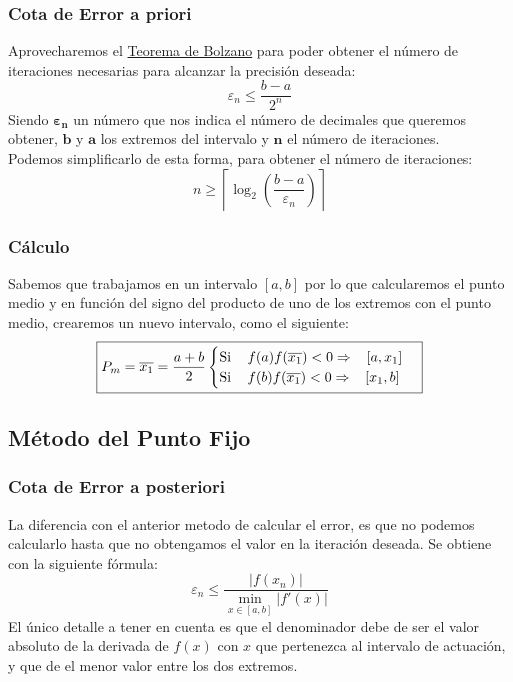 \subsubsection{Cota de Error a priori}
Aprovecharemos el \underline{Teorema de Bolzano} para poder obtener el número de iteraciones necesarias para alcanzar la precisión deseada:
\[
        \boxed{\varepsilon_n \leq \frac{b-a}{2^n}}
\]
Siendo \(\mathbf{\varepsilon_n}\) un número que nos indica el número de decimales que queremos obtener, \(\mathbf{b}\) y \(\mathbf{a}\) los extremos del intervalo y \(\mathbf{n}\) el número de iteraciones.\\ Podemos simplificarlo de esta forma, para obtener el número de iteraciones:
\[
        \boxed{n\geq \left \lceil \log_2{\left ( \frac{b-a}{\varepsilon_n} \right )} \right \rceil}
\]
\subsubsection{Cálculo}
Sabemos que trabajamos en un intervalo \([a,b]\) por lo que calcularemos el punto medio y en función del signo del producto de uno de los extremos con el punto medio, crearemos un nuevo intervalo, como el siguiente:
\[
        \boxed{P_m = \overline{x_1} = \frac{a+b}{2}
                \begin{cases}
                        \text{Si \hspace{3mm}} f(a)f(\overline{x_1}) < 0  \Rightarrow \text{\hspace{3mm}} [a, x_1] \\
                        \text{Si \hspace{3mm}} f(b)f(\overline{x_1}) < 0 \Rightarrow\text{\hspace{3mm}} [x_1, b]
                \end{cases}}
\]
\subsection{Método del Punto Fijo}
\subsubsection{Cota de Error a posteriori}
La diferencia con el anterior metodo de calcular el error, es que no podemos calcularlo hasta que no obtengamos el valor en la iteración deseada. Se obtiene con la siguiente fórmula:
\[
        \boxed{\varepsilon_n \leq\frac{\left | f(x_n) \right |}{\min _{x \in [a,b]}\left | f'(x) \right |}}
\]
El único detalle a tener en cuenta es que el denominador debe de ser el valor absoluto de la derivada de \(f(x)\) con \(x\) que pertenezca al intervalo de actuación, y que de el menor valor entre los dos extremos.

